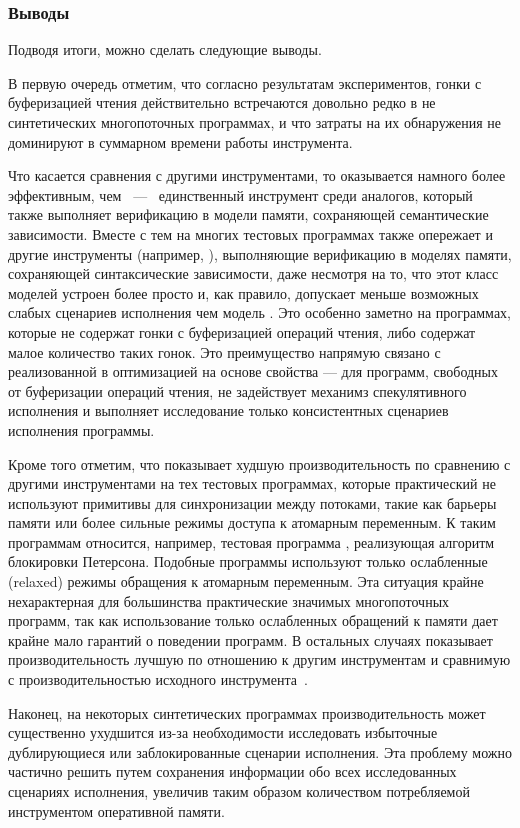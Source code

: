 \subsubsection*{Выводы}

Подводя итоги, можно сделать следующие выводы. 

В первую очередь отметим, что согласно результатам экспериментов,
гонки с буферизацией чтения действительно встречаются 
довольно редко в не синтетических многопоточных программах, 
и что затраты на их обнаружения не доминируют 
в суммарном времени работы инструмента.

Что касается сравнения с другими инструментами, 
то \wmc оказывается намного более эффективным, чем \CDSChecker~---~ 
единственный инструмент среди аналогов, который 
также выполняет верификацию в модели памяти, сохраняющей семантические зависимости.    
Вместе с тем на многих тестовых программах \wmc также опережает 
и другие инструменты (например, \hmc),
выполняющие верификацию в моделях памяти, 
сохраняющей синтаксические зависимости, даже 
несмотря на то, что этот класс моделей устроен более просто
и, как правило, допускает меньше возможных 
слабых сценариев исполнения чем модель \WkmS.
Это особенно заметно на программах, 
которые не содержат гонки с буферизацией операций чтения, 
либо содержат малое количество таких гонок. 
Это преимущество напрямую связано с реализованной в \wmc 
оптимизацией на основе свойства \LBRF --- 
для программ, свободных от буферизации операций чтения, 
\wmc не задействует механимз спекулятивного исполнения 
и выполняет исследование только \RCMM консистентных сценариев исполнения программы.

Кроме того отметим, что \wmc показывает худшую производительность 
по сравнению с другими инструментами на тех тестовых программах, 
которые практический не используют примитивы для синхронизации между потоками, 
такие как барьеры памяти или более сильные режимы доступа к атомарным переменным. 
К таким программам относится, например, тестовая программа , 
реализующая алгоритм блокировки Петерсона. 
Подобные программы используют только ослабленные (relaxed)
режимы обращения к атомарным переменным.
Эта ситуация крайне нехарактерная для большинства 
практические значимых многопоточных программ, 
так как использование только ослабленных обращений к памяти
дает крайне мало гарантий о поведении программ. 
В остальных случаях \wmc показывает производительность 
лучшую по отношению к другим инструментам
и сравнимую с производительностью исходного инструмента~\genmc.

Наконец, на некоторых синтетических программах производительность \wmc 
может существенно ухудшится из-за необходимости исследовать 
избыточные дублирующиеся или заблокированные сценарии исполнения. 
Эта проблему можно частично решить путем сохранения информации
обо всех исследованных сценариях исполнения, увеличив таким образом   
количеством потребляемой инструментом оперативной памяти.

